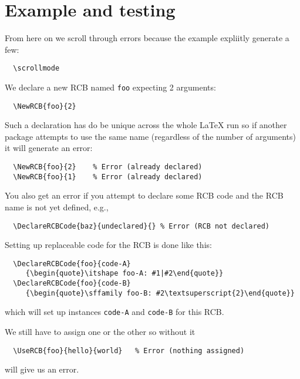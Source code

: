 \documentclass{article}
\begin{document}
\section{Example and testing}

From here on we scroll through errors because the example expliitly generate a few:
\begin{verbatim}
  \scrollmode
\end{verbatim}
\scrollmode

We declare a new RCB named \texttt{foo} expecting 2 arguments:
\begin{verbatim}
  \NewRCB{foo}{2}
\end{verbatim}

Such a declaration has do be unique across the whole \LaTeX{} run so
if another package attempts to use the same name (regardless of the
number of arguments) it will generate an error:
\begin{verbatim}
  \NewRCB{foo}{2}    % Error (already declared)
  \NewRCB{foo}{1}    % Error (already declared)
\end{verbatim}

You also get an error if you attempt to declare some RCB code and the
RCB name is not yet defined, e.g.,
\begin{verbatim}
  \DeclareRCBCode{baz}{undeclared}{} % Error (RCB not declared)
\end{verbatim}


Setting up replaceable code for the RCB is done like this:
\begin{verbatim}
  \DeclareRCBCode{foo}{code-A}
     {\begin{quote}\itshape foo-A: #1|#2\end{quote}}
  \DeclareRCBCode{foo}{code-B}
     {\begin{quote}\sffamily foo-B: #2\textsuperscript{2}\end{quote}}
\end{verbatim}
which will set up instances \texttt{code-A} and \texttt{code-B} for
this RCB.


We still have to assign one or the other so without it
\begin{verbatim}
  \UseRCB{foo}{hello}{world}   % Error (nothing assigned)
\end{verbatim}
will give us an error.
\end{document}
